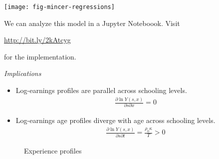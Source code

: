 \begin{frame}[plain]

\begin{center}
\texttt{[image: fig-mincer-regressions]}
\end{center}

\end{frame}
\begin{frame}
We can analyze this model in a Jupyter Noteboook. Visit
\begin{center}
\url{http://bit.ly/2kAtcyg}
\end{center}
for the implementation.
\end{frame}
\begin{frame}\begin{center}
\LARGE\textit{Implications}
\end{center}\end{frame}
\begin{frame}
\begin{itemize}
\item Log-earnings profiles are parallel across schooling levels.
\begin{align*}
\frac{\partial \ln{Y(s, x)}}{\partial s \partial x} = 0
\end{align*}
\item Log-earnings age profiles diverge with age across schooling levels.
\begin{align*}
\frac{\partial \ln{Y(s, x)}}{\partial s \partial t} = \frac{\rho_0\kappa}{T} > 0
\end{align*}
\end{itemize}
\end{frame}
\begin{frame}
\begin{figure}[htp]\centering
\caption{Experience profiles}
\end{figure}
\end{frame}
